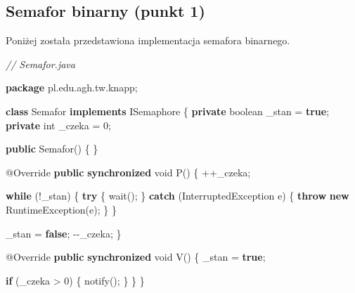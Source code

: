 \documentclass[11pt]{article}
\newenvironment{Shaded}{}{}
\newcommand{\KeywordTok}[1]{\textcolor[rgb]{0.00,0.44,0.13}{\textbf{{#1}}}}
\newcommand{\DataTypeTok}[1]{\textcolor[rgb]{0.56,0.13,0.00}{{#1}}}
\newcommand{\DecValTok}[1]{\textcolor[rgb]{0.25,0.63,0.44}{{#1}}}
\newcommand{\CommentTok}[1]{\textcolor[rgb]{0.38,0.63,0.69}{\textit{{#1}}}}
\newcommand{\FunctionTok}[1]{\textcolor[rgb]{0.02,0.16,0.49}{{#1}}}
\newcommand{\NormalTok}[1]{{#1}}
\newcommand{\ImportTok}[1]{{#1}}
\newcommand{\ControlFlowTok}[1]{\textcolor[rgb]{0.00,0.44,0.13}{\textbf{{#1}}}}
\newcommand{\OperatorTok}[1]{\textcolor[rgb]{0.40,0.40,0.40}{{#1}}}
\newcommand{\BuiltInTok}[1]{{#1}}
\newcommand{\AttributeTok}[1]{\textcolor[rgb]{0.49,0.56,0.16}{{#1}}}
\begin{document}
    \hypertarget{semafor-binarny-punkt-1}{%
\subsection{Semafor binarny (punkt 1)}\label{semafor-binarny-punkt-1}}

Poniżej została przedstawiona implementacja semafora binarnego.

\begin{Shaded}
\begin{Highlighting}[]
\CommentTok{// Semafor.java}

\KeywordTok{package}\ImportTok{ pl}\OperatorTok{.}\ImportTok{edu}\OperatorTok{.}\ImportTok{agh}\OperatorTok{.}\ImportTok{tw}\OperatorTok{.}\ImportTok{knapp}\OperatorTok{;}

\KeywordTok{class}\NormalTok{ Semafor }\KeywordTok{implements}\NormalTok{ ISemaphore }\OperatorTok{\{}
    \KeywordTok{private} \DataTypeTok{boolean}\NormalTok{ \_stan }\OperatorTok{=} \KeywordTok{true}\OperatorTok{;}
    \KeywordTok{private} \DataTypeTok{int}\NormalTok{ \_czeka }\OperatorTok{=} \DecValTok{0}\OperatorTok{;}

    \KeywordTok{public} \FunctionTok{Semafor}\OperatorTok{()} \OperatorTok{\{}
    \OperatorTok{\}}

    \AttributeTok{@Override}
    \KeywordTok{public} \KeywordTok{synchronized} \DataTypeTok{void} \FunctionTok{P}\OperatorTok{()} \OperatorTok{\{}
        \OperatorTok{++}\NormalTok{\_czeka}\OperatorTok{;}

        \ControlFlowTok{while} \OperatorTok{(!}\NormalTok{\_stan}\OperatorTok{)} \OperatorTok{\{}
            \ControlFlowTok{try} \OperatorTok{\{}
                \FunctionTok{wait}\OperatorTok{();}
            \OperatorTok{\}} \ControlFlowTok{catch} \OperatorTok{(}\BuiltInTok{InterruptedException}\NormalTok{ e}\OperatorTok{)} \OperatorTok{\{}
                \ControlFlowTok{throw} \KeywordTok{new} \BuiltInTok{RuntimeException}\OperatorTok{(}\NormalTok{e}\OperatorTok{);}
            \OperatorTok{\}}
        \OperatorTok{\}}

\NormalTok{        \_stan }\OperatorTok{=} \KeywordTok{false}\OperatorTok{;}
        \OperatorTok{{-}{-}}\NormalTok{\_czeka}\OperatorTok{;}
    \OperatorTok{\}}

    \AttributeTok{@Override}
    \KeywordTok{public} \KeywordTok{synchronized} \DataTypeTok{void} \FunctionTok{V}\OperatorTok{()} \OperatorTok{\{}
\NormalTok{        \_stan }\OperatorTok{=} \KeywordTok{true}\OperatorTok{;}

        \ControlFlowTok{if} \OperatorTok{(}\NormalTok{\_czeka }\OperatorTok{\textgreater{}} \DecValTok{0}\OperatorTok{)} \OperatorTok{\{}
            \FunctionTok{notify}\OperatorTok{();}
        \OperatorTok{\}}
    \OperatorTok{\}}
\OperatorTok{\}}
\end{Highlighting}
\end{Shaded}
\end{document}
